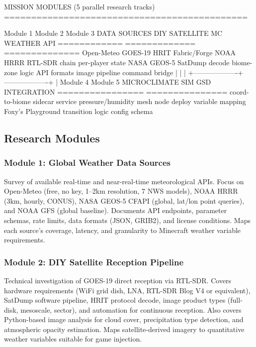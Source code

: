 \documentclass[11pt,letterpaper]{article}
\begin{document}
\begin{asciibox}
MISSION MODULES (5 parallel research tracks)
=============================================

  Module 1            Module 2            Module 3
  DATA SOURCES        DIY SATELLITE       MC WEATHER API
  ============        =============       ==============
  Open-Meteo          GOES-19 HRIT        Fabric/Forge
  NOAA HRRR           RTL-SDR chain       per-player state
  NASA GEOS-5         SatDump decode      biome-zone logic
  API formats         image pipeline      command bridge
       |                   |                   |
       +-------------------+-------------------+
                           |
  Module 4            Module 5
  MICROCLIMATE SIM    GSD INTEGRATION
  ================    ===============
  coord-to-biome      sidecar service
  pressure/humidity   mesh node deploy
  variable mapping    Foxy's Playground
  transition logic    config schema
\end{asciibox}

\subsection{Research Modules}

\subsubsection{Module 1: Global Weather Data Sources}
Survey of available real-time and near-real-time meteorological APIs. Focus on Open-Meteo (free, no key, 1--2km resolution, 7 NWS models), NOAA HRRR (3km, hourly, CONUS), NASA GEOS-5 CFAPI (global, lat/lon point queries), and NOAA GFS (global baseline). Documents API endpoints, parameter schemas, rate limits, data formats (JSON, GRIB2), and license conditions. Maps each source's coverage, latency, and granularity to Minecraft weather variable requirements.

\subsubsection{Module 2: DIY Satellite Reception Pipeline}
Technical investigation of GOES-19 direct reception via RTL-SDR. Covers hardware requirements (WiFi grid dish, LNA, RTL-SDR Blog V4 or equivalent), SatDump software pipeline, HRIT protocol decode, image product types (full-disk, mesoscale, sector), and automation for continuous reception. Also covers Python-based image analysis for cloud cover, precipitation type detection, and atmospheric opacity estimation. Maps satellite-derived imagery to quantitative weather variables suitable for game injection.
\end{document}
